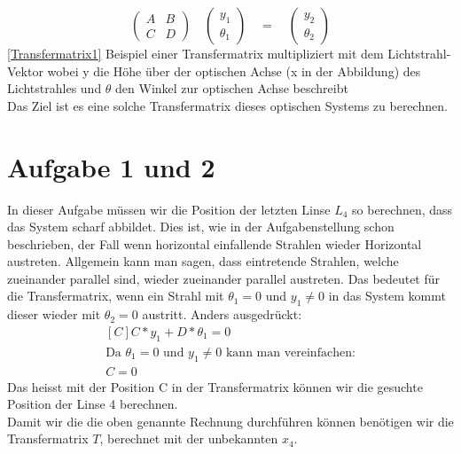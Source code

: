 \documentclass[11pt,twoside,a4paper]{article}
\begin{document}
	\begin{equation} \label{Transfermatrix1}
	\begin{pmatrix}
	A & B \\
	C & D
	\end{pmatrix}
	\quad
	\begin{pmatrix}
	y_{1}\\
	\theta_{1}
	\end{pmatrix}
	\quad
	=
	\quad
	\begin{pmatrix}
	y_{2}\\
	\theta_{2}
	\end{pmatrix}
	\end{equation}
	\ref{Transfermatrix1} Beispiel einer Transfermatrix multipliziert mit dem Lichtstrahl-Vektor wobei y die Höhe über der optischen Achse (x in der Abbildung) des Lichtstrahles und \(\theta\) den Winkel zur optischen Achse beschreibt \\
	
	Das Ziel ist es eine solche Transfermatrix dieses optischen Systems zu berechnen. 
	\section{Aufgabe 1 und 2}
	In dieser Aufgabe müssen wir die Position der letzten Linse \(L_{4}\) so berechnen, dass das System scharf abbildet. Dies ist, wie in der Aufgabenstellung schon beschrieben, der Fall wenn horizontal einfallende Strahlen wieder Horizontal austreten. Allgemein kann man sagen, dass eintretende Strahlen, welche zueinander parallel sind, wieder zueinander parallel austreten.
	Das bedeutet für die Transfermatrix, wenn ein Strahl mit \(\theta_{1} = 0\) und \(y_{1} \neq 0\) in das System kommt dieser wieder mit \(\theta_{2} = 0\) austritt. Anders ausgedrückt: 
	\begin{equation} \label{scharfAbb}
	\begin{aligned}[C]
		C * y_{1} + D * \theta_{1} = 0 \nonumber \\
		\textrm{Da \(\theta_{1} = 0\) und \(y_{1} \neq 0\) kann man vereinfachen:} \nonumber\\
		C = 0
	\end{aligned}
	\end{equation}
	Das heisst mit der Position C in der Transfermatrix können wir die gesuchte Position der Linse 4 berechnen. \\
	Damit wir die die oben genannte Rechnung durchführen können benötigen wir die Transfermatrix \(T\), berechnet mit der unbekannten \(x_{4}\).  
\end{document}
